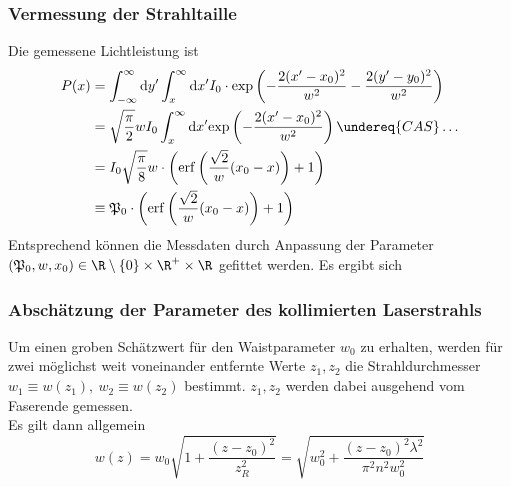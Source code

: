 \documentclass[11pt,a4paper,oneside]{scrartcl}
\begin{document}
\subsubsection{Vermessung der Strahltaille}
Die gemessene Lichtleistung ist 
\begin{align}
P(x)&=\int_{-\infty}^\infty \mathrm dy^\prime \int_x^\infty \mathrm dx^\prime I_0\cdot\mathrm{exp}\left(-\frac{2(x^\prime-x_0)^2}{w^2}-\frac{2(y^\prime-y_0)^2}{w^2}\right) \\ \quad& = \sqrt{\frac{\pi}{2}}wI_0\int_x^\infty \mathrm dx^\prime \mathrm{exp}\left(-\frac{2(x^\prime-x_0)^2}{w^2}\right) \undereq{CAS}\hdots \\ \quad& =I_0\sqrt{\frac{\pi}{8}}w\cdot\left(\mathrm{erf}\left(\frac{\sqrt{2}}{w}(x_0-x)\right)+1\right)\\ \quad& \equiv \mathfrak{P}_0\cdot\left(\mathrm{erf}\left(\frac{\sqrt{2}}{w}(x_0-x)\right)+1\right)
\end{align}
Entsprechend können die Messdaten durch Anpassung der Parameter $(\mathfrak P_0,w,x_0)\in \R\setminus\{0\}\times\R^+\times\R$ gefittet werden.
Es ergibt sich 
\subsubsection{Abschätzung der Parameter des kollimierten Laserstrahls}
Um einen groben Schätzwert für den Waistparameter $w_0$ zu erhalten, werden für zwei möglichst weit voneinander entfernte Werte $z_1,z_2$ die Strahldurchmesser $w_1\equiv w(z_1),\ w_2\equiv w(z_2)$ bestimmt. $z_1,z_2$ werden dabei ausgehend vom Faserende gemessen. \\
Es gilt dann allgemein
\begin{equation}\label{w(z)}
w(z)=w_0\sqrt{1+\frac{(z-z_0)^2}{z_R^2}}=\sqrt{w_0^2+\frac{(z-z_0)^2\lambda^2}{\pi^2n^2w_0^2}}
\end{equation}

\end{document}
